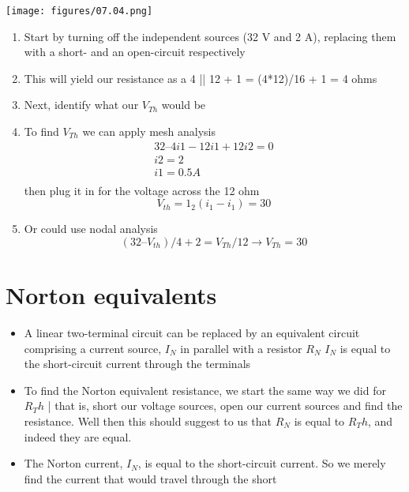 \documentclass[11pt]{book}
\begin{document}
\texttt{[image: figures/07.04.png]}

\begin{enumerate}
	\item Start by turning off the independent sources (32 V and 2 A), replacing them with a short- and an open-circuit respectively
	\item This will yield our resistance as a 4 || 12 + 1 = (4*12)/16 + 1 = 4 ohms
	\item Next, identify what our $V_{Th}$ would be
	\item To find $V_{Th}$ we can apply mesh analysis
	\begin{eqnarray}
		32 – 4i1 -12i1 + 12i2 = 0 \\ 
		i2 = 2 \\ 
		i1 = 0.5 A \\ 
	\end{eqnarray} 
	then plug it in for the voltage across the 12 ohm 
	\begin{equation}
		V_{th} = 1_2(i_1-i_1) = 30
	\end{equation}
	\item Or could use nodal analysis
	\begin{equation}
		(32 – V_{th})/4 + 2 = V_{Th}/12 \rightarrow V_{Th} = 30 
	\end{equation} 
\end{enumerate}

\newpage

\section{Norton equivalents}
\begin{itemize}
	\item A linear two-terminal circuit can be replaced by an equivalent circuit comprising a current source, $I_N$ in parallel with a resistor $R_N$
	\subitem $I_N$ is equal to the short-circuit current through the terminals
	\item To find the Norton equivalent resistance, we start the same way we did for $R_Th$ | that is, short our voltage sources, open our current sources and find the resistance.
	\subitem Well then this should suggest to us that $R_N$ is equal to $R_Th$, and indeed they are equal.
	\item The Norton current, $I_N$, is equal to the short-circuit current. 
	\subitem So we merely find the current that would travel through the short 
\end{itemize}
\end{document}
